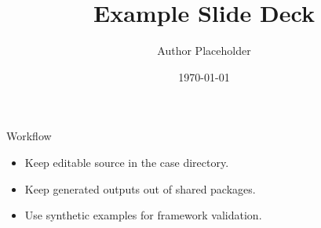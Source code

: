 \documentclass{beamer}
\title{Example Slide Deck}
\author{Author Placeholder}
\date{\today}
\begin{document}
\begin{frame}
  \titlepage
\end{frame}

\begin{frame}{Workflow}
  \begin{itemize}
    \item Keep editable source in the case directory.
    \item Keep generated outputs out of shared packages.
    \item Use synthetic examples for framework validation.
  \end{itemize}
\end{frame}
\end{document}
